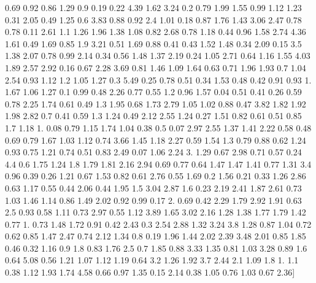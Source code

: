 \documentclass[preview]{standalone}
\begin{document}
\begin{center}
 0.69 0.92 0.86 1.29 0.9  0.19 0.22 4.39 1.62 3.24 0.2  0.79 1.99 1.55
 0.99 1.12 1.23 0.31 2.05 0.49 1.25 0.6  3.83 0.88 0.92 2.4  1.01 0.18
 0.87 1.76 1.43 3.06 2.47 0.78 0.78 0.11 2.61 1.1  1.26 1.96 1.38 1.08
 0.82 2.68 0.78 1.18 0.44 0.96 1.58 2.74 4.36 1.61 0.49 1.69 0.85 1.9
 3.21 0.51 1.69 0.88 0.41 0.43 1.52 1.48 0.34 2.09 0.15 3.5  1.38 2.07
 0.78 0.99 2.14 0.34 0.56 1.48 1.37 2.19 0.24 1.05 2.71 0.64 1.16 1.55
 4.03 1.89 2.57 2.92 0.16 0.67 2.28 3.69 0.81 1.46 1.09 1.64 0.63 0.71
 1.96 1.93 0.7  1.04 2.54 0.93 1.12 1.2  1.05 1.27 0.3  5.49 0.25 0.78
 0.51 0.34 1.53 0.48 0.42 0.91 0.93 1.   1.67 1.06 1.27 0.1  0.99 0.48
 2.26 0.77 0.55 1.2  0.96 1.57 0.04 0.51 0.41 0.26 0.59 0.78 2.25 1.74
 0.61 0.49 1.3  1.95 0.68 1.73 2.79 1.05 1.02 0.88 0.47 3.82 1.82 1.92
 1.98 2.82 0.7  0.41 0.59 1.3  1.24 0.49 2.12 2.55 1.24 0.27 1.51 0.82
 0.61 0.51 0.85 1.7  1.18 1.   0.08 0.79 1.15 1.74 1.04 0.38 0.5  0.07
 2.97 2.55 1.37 1.41 2.22 0.58 0.48 0.69 0.79 1.67 1.03 1.12 0.74 3.66
 1.45 1.18 2.27 0.59 1.54 1.3  0.79 0.88 0.62 1.24 0.93 0.75 1.21 0.74
 0.51 0.83 2.49 0.07 1.06 2.24 3.   1.29 0.67 2.98 0.71 0.57 0.24 4.4
 0.6  1.75 1.24 1.8  1.79 1.81 2.16 2.94 0.69 0.77 0.64 1.47 1.47 1.41
 0.77 1.31 3.4  0.96 0.39 0.26 1.21 0.67 1.53 0.82 0.61 2.76 0.55 1.69
 0.2  1.56 0.21 0.33 1.26 2.86 0.63 1.17 0.55 0.44 2.06 0.44 1.95 1.5
 3.04 2.87 1.6  0.23 2.19 2.41 1.87 2.61 0.73 1.03 1.46 1.14 0.86 1.49
 2.02 0.92 0.99 0.17 2.   0.69 0.42 2.29 1.79 2.92 1.91 0.63 2.5  0.93
 0.58 1.11 0.73 2.97 0.55 1.12 3.89 1.65 3.02 2.16 1.28 1.38 1.77 1.79
 1.42 0.77 1.   0.73 1.48 1.72 0.91 0.42 2.43 0.3  2.54 2.88 1.32 3.24
 3.8  1.28 0.87 1.04 0.72 0.62 0.85 1.47 2.47 0.74 2.12 1.34 0.8  0.19
 1.96 1.44 2.02 2.39 3.48 2.01 0.85 1.85 0.46 0.32 1.16 0.9  1.8  0.83
 1.76 2.5  0.7  1.85 0.88 3.33 1.35 0.81 1.03 3.28 0.89 1.6  0.64 5.08
 0.56 1.21 1.07 1.12 1.19 0.64 3.2  1.26 1.92 3.7  2.44 2.1  1.09 1.8
 1.   1.1  0.38 1.12 1.93 1.74 4.58 0.66 0.97 1.35 0.15 2.14 0.38 1.05
 0.76 1.03 0.67 2.36]
\end{center}
\end{document}
